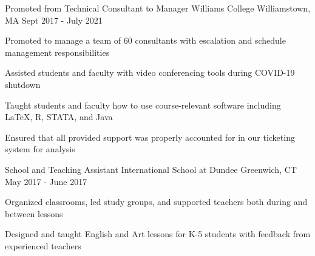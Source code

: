 \begin{cventries}
  \cventry
  {Promoted from Technical Consultant to Manager}
  {Williams College}
  {Williamstown, MA}
  {Sept 2017 - July 2021}
  {
    \begin{cvitems}
      \item {Promoted to manage a team of 60 consultants with escalation and schedule management responsibilities}
      \item {Assisted students and faculty with video conferencing tools during COVID-19 shutdown}
      \item {Taught students and faculty how to use course-relevant software including LaTeX, R, STATA, and Java}
      \item {Ensured that all provided support was properly accounted for in our ticketing system for analysis}
    \end{cvitems}
  }

  \cventry
  {School and Teaching Assistant}
  {International School at Dundee}
  {Greenwich, CT}
  {May 2017 - June 2017}
  {
    \begin{cvitems}
      \item{Organized classrooms, led study groups, and supported teachers both during and between lessons}
      \item{Designed and taught English and Art lessons for K-5 students with feedback from experienced teachers}
    \end{cvitems}
  }
\end{cventries}

